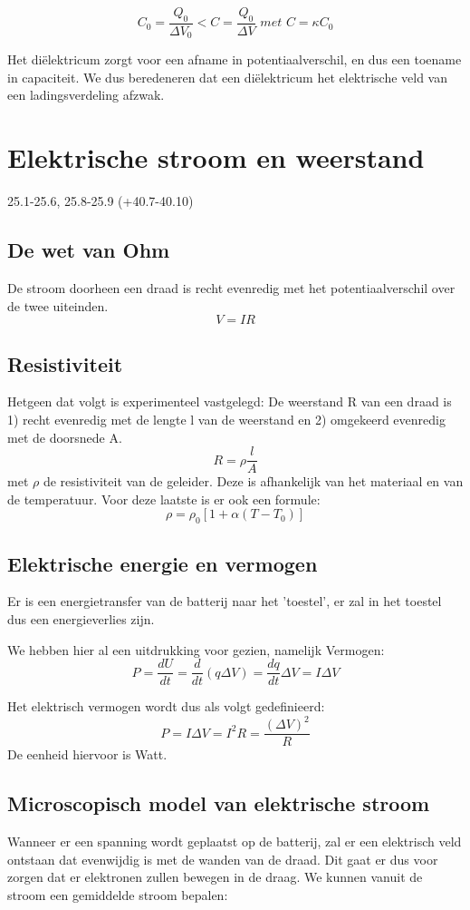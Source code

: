 \documentclass[12pt,a4paper]{article}
\begin{document}
    $$C_{0} = \frac{Q_{0}}{\Delta V_{0}} < C = \frac{Q_{0}}{\Delta V} \textit{ met } C = \kappa C_{0}$$
    
    Het diëlektricum zorgt voor een afname in potentiaalverschil, en dus een toename in capaciteit. We dus beredeneren 
    dat een diëlektricum het elektrische veld van een ladingsverdeling afzwak. 
    

    \section{Elektrische stroom en weerstand}
    25.1-25.6, 25.8-25.9 (+40.7-40.10)
    \subsection{De wet van Ohm}
    De stroom doorheen een draad is recht evenredig met het potentiaalverschil over de twee uiteinden.
    \[V = IR\]
    
    \subsection{Resistiviteit}
    Hetgeen dat volgt is experimenteel vastgelegd:
    De weerstand R van een draad is 1) recht evenredig met de lengte l van de weerstand en 2) omgekeerd evenredig met de doorsnede A.
    \[R = \rho\frac{l}{A}\]
    met $\rho$ de resistiviteit van de geleider. Deze is afhankelijk van het materiaal en van de temperatuur. Voor deze laatste is er ook een formule: 
    \[\rho = \rho_0[1 + \alpha (T - T_0)]\]
    
    \subsection{Elektrische energie en vermogen}
    Er is een energietransfer van de batterij naar het 'toestel', er zal in het toestel dus een energieverlies zijn. 
    
    We hebben hier al een uitdrukking voor gezien, namelijk Vermogen: 
    \[P = \frac{dU}{dt} = \frac{d}{dt}(q\Delta V) = \frac{dq}{dt}\Delta V = I\Delta V\]
    
    Het elektrisch vermogen wordt dus als volgt gedefinieerd: 
    \[P = I\Delta V = I^2R = \frac{(\Delta V)^2}{R}\]
    De eenheid hiervoor is Watt.
    
    \subsection{Microscopisch model van elektrische stroom}
    Wanneer er een spanning wordt geplaatst op de batterij, zal er een elektrisch veld ontstaan dat evenwijdig is met de wanden van de draad. Dit gaat er dus voor zorgen dat er elektronen zullen bewegen in de draag. We kunnen vanuit de stroom een gemiddelde stroom bepalen: 
    
\end{document}
